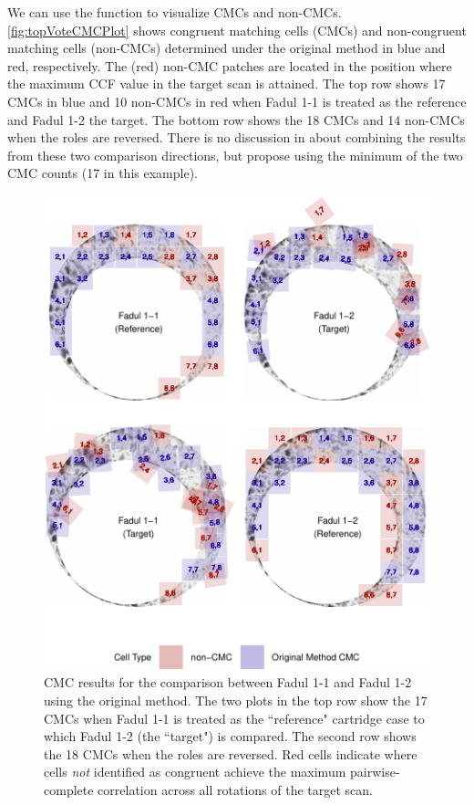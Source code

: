 We can use the  function to visualize CMCs and non-CMCs.
\autoref{fig:topVoteCMCPlot} shows congruent matching cells (CMCs) and
non-congruent matching cells (non-CMCs) determined under the original
method in blue and red, respectively. The (red) non-CMC patches are
located in the position where the maximum CCF value in the target scan
is attained. The top row shows 17 CMCs in blue and 10 non-CMCs in red
when Fadul 1-1 is treated as the reference and Fadul 1-2 the target. The
bottom row shows the 18 CMCs and 14 non-CMCs when the roles are
reversed. There is no discussion in \citet{song_proposed_2013} about
combining the results from these two comparison directions, but
\citet{tong_improved_2015} propose using the minimum of the two CMC
counts (17 in this example).

\begin{Schunk}
\begin{figure}[htbp]

{\centering \includegraphics[width=\textwidth]{figures/kmOriginalMethod} 

}

\caption{\label{fig:topVoteCMCPlot} CMC results for the comparison between Fadul 1-1 and Fadul 1-2 using the original method. The two plots in the top row show the 17 CMCs when Fadul 1-1 is treated as the ``reference" cartridge case to which Fadul 1-2 (the ``target") is compared. The second row shows the 18 CMCs when the roles are reversed. Red cells indicate where cells \emph{not} identified as congruent achieve the maximum pairwise-complete correlation across all rotations of the target scan. }\label{fig:unnamed-chunk-16}
\end{figure}
\end{Schunk}

